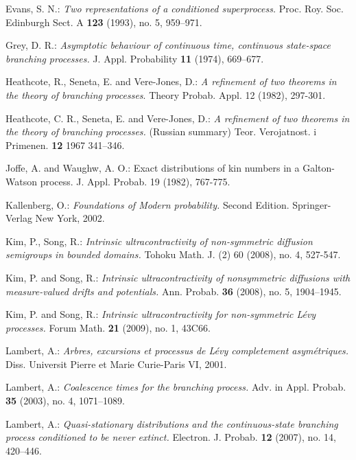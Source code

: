 \documentclass[12pt,a4paper]{amsart}
\numberwithin{equation}{section}
\theoremstyle{plain}
\theoremstyle{definition}
\theoremstyle{remark}
\begin{document}
\begin{thebibliography}{99}
Evans, S. N.:
\emph{Two representations of a conditioned superprocess.}
Proc. Roy. Soc. Edinburgh Sect. A \textbf{123} (1993), no. 5, 959--971.

Grey, D. R.:
\emph{Asymptotic behaviour of continuous time, continuous state-space branching processes.}
J. Appl. Probability \textbf{11} (1974), 669--677.

Heathcote, R.,  Seneta, E.  and Vere-Jones, D.:  
\emph{ A refinement of two theorems in the theory of branching processes}. 
Theory Probab. Appl. 12 (1982), 297-301.

Heathcote, C. R., Seneta, E. and Vere-Jones, D.:
\emph{A refinement of two theorems in the theory of branching processes.} (Russian summary)
Teor. Verojatnost. i Primenen. \textbf{12} 1967 341--346.

Joffe, A. and Waughw, A. O.:  Exact distributions of kin numbers in a Galton-Watson
process. J. Appl. Probab. 19 (1982), 767-775.

	Kallenberg, O.:
	\emph{Foundations of Modern probability.}
	Second Edition.	Springer-Verlag New York, 2002.

Kim, P., Song, R.:
\emph{Intrinsic ultracontractivity of non-symmetric diffusion semigroups in bounded domains.}
Tohoku Math. J. (2) 60 (2008), no. 4, 527-547.

Kim, P. and Song, R.:
\emph{Intrinsic ultracontractivity of nonsymmetric diffusions with measure-valued drifts and potentials.}
Ann. Probab. \textbf{36} (2008), no. 5, 1904--1945.

Kim, P. and Song, R.:
\emph{Intrinsic ultracontractivity for non-symmetric L\'evy processes.}
Forum Math. \textbf{21} (2009), no. 1, 43C66.

Lambert, A.:
\emph{Arbres, excursions et processus de L\'evy completement asym\'etriques.}
Diss. Universit Pierre et Marie Curie-Paris VI, 2001.

Lambert, A.:
\emph{Coalescence times for the branching process.}
Adv. in Appl. Probab. \textbf{35} (2003), no. 4, 1071--1089.

Lambert, A.:
\emph{Quasi-stationary distributions and the continuous-state branching process conditioned to be never extinct.}
Electron. J. Probab. \textbf{12} (2007), no. 14, 420--446.


\end{thebibliography}
\end{document}
